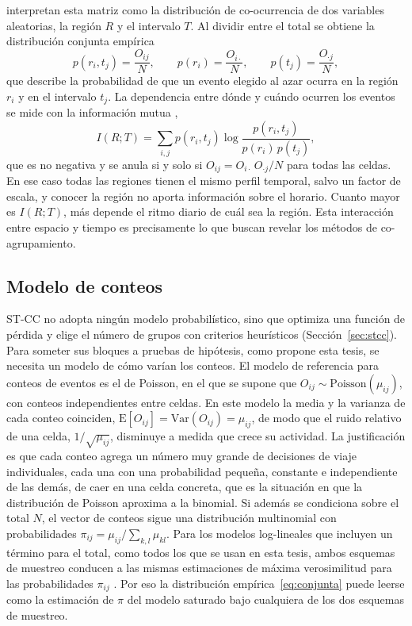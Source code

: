\citet{Liu2021} interpretan esta matriz como la distribución de co-ocurrencia de dos
variables aleatorias, la región $R$ y el intervalo $T$. Al dividir entre el total
se obtiene la distribución conjunta empírica
\begin{equation}\label{eq:conjunta}
  p(r_i, t_j) = \frac{O_{ij}}{N}, \qquad
  p(r_i) = \frac{O_{i\cdot}}{N}, \qquad
  p(t_j) = \frac{O_{\cdot j}}{N},
\end{equation}
que describe la probabilidad de que un evento elegido al azar ocurra en la región
$r_i$ y en el intervalo $t_j$. La dependencia entre dónde y cuándo ocurren los
eventos se mide con la información mutua \citep{Cover2006},
\begin{equation}\label{eq:im}
  I(R;T) = \sum_{i,j} p(r_i,t_j) \log \frac{p(r_i,t_j)}{p(r_i)\,p(t_j)} ,
\end{equation}
que es no negativa y se anula si y solo si
$O_{ij} = O_{i\cdot}\,O_{\cdot j}/N$ para todas las celdas. En ese caso todas las
regiones tienen el mismo perfil temporal, salvo un factor de escala, y conocer la
región no aporta información sobre el horario. Cuanto mayor es $I(R;T)$, más
depende el ritmo diario de cuál sea la región. Esta interacción entre
espacio y tiempo es precisamente lo que buscan revelar los métodos de
co-agrupamiento.

\subsection{Modelo de conteos}\label{sec:modelo-conteos}

ST-CC no adopta ningún modelo probabilístico, sino que optimiza una función de
pérdida y elige el número de grupos con criterios heurísticos (Sección~\ref{sec:stcc}).
Para someter sus bloques a pruebas de hipótesis, como propone esta tesis, se
necesita un modelo de cómo varían los conteos. El modelo de referencia para
conteos de eventos es el de Poisson, en el que se supone que
$O_{ij} \sim \mathrm{Poisson}(\mu_{ij})$, con conteos independientes entre celdas.
En este modelo la media y la varianza de cada conteo coinciden,
$\mathrm{E}[O_{ij}] = \mathrm{Var}(O_{ij}) = \mu_{ij}$, de modo que el ruido
relativo de una celda, $1/\sqrt{\mu_{ij}}$, disminuye a medida que crece su
actividad. La justificación es que cada conteo agrega un número muy grande de
decisiones de viaje individuales, cada una con una probabilidad pequeña,
constante e independiente de las demás, de caer en una celda concreta, que es la
situación en que la distribución de Poisson aproxima a la binomial. Si además se
condiciona sobre el total $N$, el vector de conteos sigue una distribución
multinomial con probabilidades $\pi_{ij} = \mu_{ij}/\sum_{k,l} \mu_{kl}$. Para
los modelos log-lineales que incluyen un término para el total, como todos los
que se usan en esta tesis, ambos esquemas de muestreo conducen a las mismas
estimaciones de máxima verosimilitud para las probabilidades $\pi_{ij}$
\citep{Agresti2013}. Por eso la distribución empírica~\eqref{eq:conjunta} puede
leerse como la estimación de $\pi$ del modelo saturado bajo cualquiera de los dos
esquemas de muestreo.

